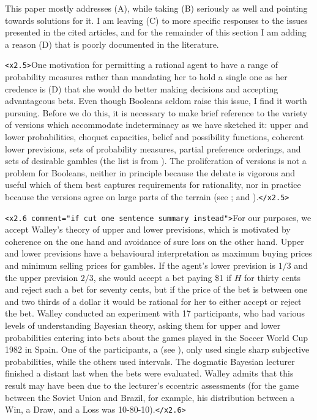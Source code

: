 \documentclass[11pt]{article}
\begin{document}
This paper mostly addresses (A), while taking (B) seriously as well and pointing towards solutions for it. I am leaving (C) to more specific responses to the issues presented in the cited articles, and for the remainder of this section I am adding a reason (D) that is poorly documented in the literature.

\texttt{<x2.5>}One motivation for permitting a rational agent to have a range of probability measures rather than mandating her to hold a single one as her credence is (D) that she would do better making decisions and accepting advantageous bets. Even though Booleans seldom raise this issue, I find it worth pursuing. Before we do this, it is necessary to make brief reference to the variety of versions which accommodate indeterminacy as we have sketched it: upper and lower probabilities, choquet capacities, belief and possibility functions, coherent lower previsions, sets of probability measures, partial preference orderings, and sets of desirable gambles (the list is from ). The proliferation of versions is not a problem for Booleans, neither in principle because the debate is vigorous and useful which of them best captures requirements for rationality, nor in practice because the versions agree on large parts of the terrain (see ; and ).\texttt{</x2.5>}

\texttt{<x2.6 comment="if cut one sentence summary instead">}For our purposes, we accept Walley's theory of upper and lower previsions, which is motivated by coherence on the one hand and avoidance of sure loss on the other hand. Upper and lower previsions have a behavioural interpretation as maximum buying prices and minimum selling prices for gambles. If the agent's lower prevision is $1/3$ and the upper prevision $2/3$, she would accept a bet paying \$1 if $H$ for thirty cents and reject such a bet for seventy cents, but if the price of the bet is between one and two thirds of a dollar it would be rational for her to either accept or reject the bet. Walley conducted an experiment with 17 participants, who had various levels of understanding Bayesian theory, asking them for upper and lower probabilities entering into bets about the games played in the Soccer World Cup 1982 in Spain. One of the participants, a  (see ), only used single sharp subjective probabilities, while the others used intervals. The dogmatic Bayesian lecturer finished a distant last when the bets were evaluated. Walley admits that this result may have been due to the lecturer's eccentric assessments (for the game between the Soviet Union and Brazil, for example, his distribution between a Win, a Draw, and a Loss was 10-80-10).\texttt{</x2.6>}
\end{document}
